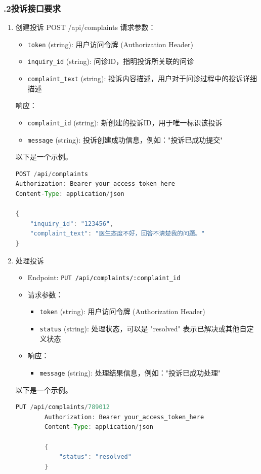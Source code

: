 \documentclass[24pt,a4paper]{article}%
\begin{document}
\subsubsection*{.2投诉接口要求}
\begin{enumerate}
	\item 创建投诉
	POST /api/complaints
	请求参数：
	\begin{itemize}
	\item \texttt{token} (string): 用户访问令牌 (Authorization Header)
	\item \texttt{inquiry\_id} (string): 问诊ID，指明投诉所关联的问诊
	\item \texttt{complaint\_text} (string): 投诉内容描述，用户对于问诊过程中的投诉详细描述
	\end{itemize}
	响应：
	\begin{itemize}
		\item \texttt{complaint\_id} (string): 新创建的投诉ID，用于唯一标识该投诉
		\item \texttt{message} (string): 投诉创建成功信息，例如："投诉已成功提交"
	\end{itemize}
	以下是一个示例。
	\begin{lstlisting}[language=java]
POST /api/complaints
Authorization: Bearer your_access_token_here
Content-Type: application/json

{
	"inquiry_id": "123456",
	"complaint_text": "医生态度不好，回答不清楚我的问题。"
}
	\end{lstlisting}
	
	\item 处理投诉 
	\begin{itemize}
		\item Endpoint: \texttt{PUT /api/complaints/:complaint\_id}
		\item 请求参数：
		\begin{itemize}
			\item \texttt{token} (string): 用户访问令牌 (Authorization Header)
			\item \texttt{status} (string): 处理状态，可以是 "resolved" 表示已解决或其他自定义状态
		\end{itemize}
		\item 响应：
		\begin{itemize}
			\item \texttt{message} (string): 处理结果信息，例如："投诉已成功处理"
		\end{itemize}
	\end{itemize}
	
	以下是一个示例。
	
	\begin{lstlisting}[language=java]
		PUT /api/complaints/789012
		Authorization: Bearer your_access_token_here
		Content-Type: application/json
		
		{
			"status": "resolved"
		}
	\end{lstlisting}	
\end{enumerate}
\end{document}
